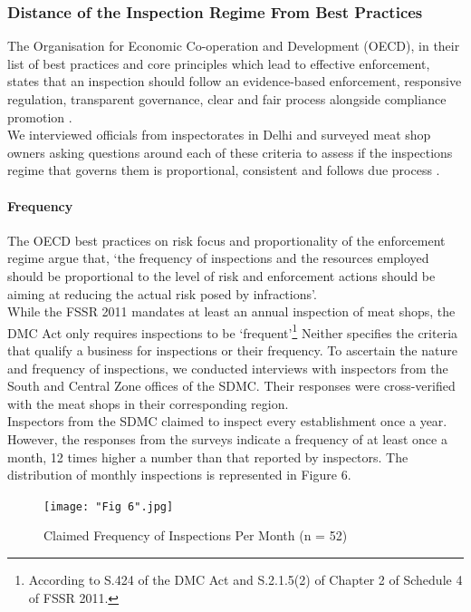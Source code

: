 \documentclass[a4paper, 12pt, twoside]{article}
\begin{document}
\subsubsection{Distance of the Inspection Regime From Best Practices}

The Organisation for Economic Co-operation and Development (OECD), in their list of best practices and core principles which lead to effective enforcement, states that an inspection should follow an evidence-based enforcement, responsive regulation, transparent governance, clear and fair process alongside compliance promotion \parencite{oecd1report}. \\

We interviewed officials from inspectorates in Delhi and surveyed meat shop owners asking questions around each of these criteria to assess if the inspections regime that governs them is proportional, consistent and follows due process \parencite{oecd1report}. 

\paragraph{Frequency}
The OECD best practices on risk focus and proportionality of the enforcement regime argue that, ‘the frequency of inspections and the resources employed should be proportional to the level of risk and enforcement actions should be aiming at reducing the actual risk posed by infractions’. \\

While the FSSR 2011 mandates at least an annual inspection of meat shops, the DMC Act only requires inspections to be ‘frequent’\footnote{According to S.424 of the DMC Act and S.2.1.5(2) of Chapter 2 of Schedule 4 of FSSR 2011.} Neither specifies the criteria that qualify a business for inspections or their frequency. To ascertain the nature and frequency of inspections, we conducted interviews with inspectors from the South and Central Zone offices of the SDMC. Their responses were cross-verified with the meat shops in their corresponding region. \\

Inspectors from the SDMC claimed to inspect every establishment once a year. However, the responses from the surveys indicate a frequency of at least once a month, 12 times higher a number than that reported by inspectors. The distribution of monthly inspections is represented in Figure 6. 

\begin{figure}[H]
\centering
\texttt{[image: "Fig 6".jpg]}
\captionsetup{justification=centering}\caption[Optional Caption]{Claimed Frequency of Inspections Per Month (n = 52)}
\end{figure} 
\end{document}
